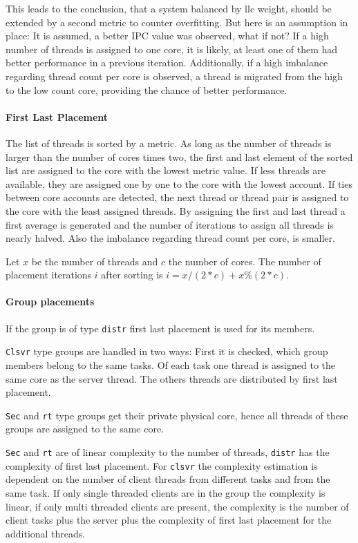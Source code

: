 This leads to the conclusion, that a system balanced by \gls{llc} weight,
should be extended by a second metric to counter overfitting.
But here is an assumption in place: It is assumed, a better IPC value was
observed, what if not?
If a high number of threads is assigned to one core, it is likely, at least one
of them had better performance in a previous iteration.
Additionally, if a high imbalance regarding thread count per core is observed,
a thread is migrated from the high to the low count core, providing the chance
of better performance.


\paragraph{First Last Placement}
The list of threads is sorted by a metric.
As long as the number of threads is larger than the number of cores times two,
the first and last element of the sorted list are assigned to the core with the
lowest metric value.
If less threads are available, they are assigned one by one to the core with
the lowest account.
If ties between core accounts are detected, the next thread or thread pair is
assigned to the core with the least assigned threads.
By assigning the first and last thread a first average is generated and the
number of iterations to assign all threads is nearly halved.
Also the imbalance regarding thread count per core, is smaller.

Let $x$ be the number of threads and $c$ the number of cores.
The number of placement iterations $i$ after sorting is
$i = x / (2*c) + x \% (2*c)$.


\paragraph{Group placements}
If the group is of type \texttt{distr} first last placement is used for its
members.

\texttt{Clsvr} type groups are handled in two ways: First it is checked, which
group members belong to the same tasks.
Of each task one thread is assigned to the same core as the server thread.
The others threads are distributed by first last placement.

\texttt{Sec} and \texttt{rt} type groups get their private physical core, hence
all threads of these groups are assigned to the same core.

\texttt{Sec} and \texttt{rt} are of linear complexity to the number of threads,
\texttt{distr} has the complexity of first last placement.
For \texttt{clsvr} the complexity estimation is dependent on the number of client
threads from different tasks and from the same task.
If only single threaded clients are in the group the complexity is linear, if
only multi threaded clients are present, the complexity is the number of
client tasks plus the server plus the complexity of first last placement for
the additional threads.


